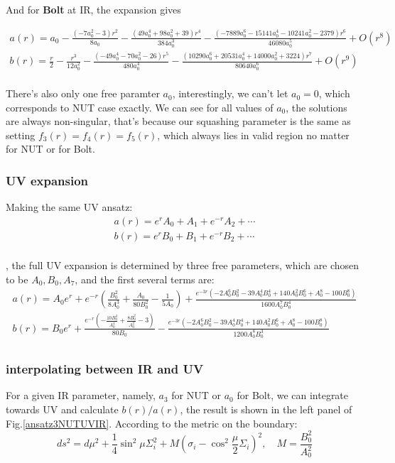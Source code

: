 \documentclass[12pt, a4paper]{article}
\numberwithin{equation}{section}
\newcommand{\be}{\begin{equation}}
\newcommand{\ee}{\end{equation}}
\begin{document}
	And for \textbf{Bolt} at IR, the expansion gives
	
\be
\begin{aligned}
	a(r) = a_0-\frac{\left(-7 a_0^2-3\right) r^2}{8 a_0}-\frac{\left(49 a_0^4+98 a_0^2+39\right) r^4}{384 a_0^3}-\frac{\left(-7889 a_0^6-15141
		a_0^4-10241 a_0^2-2379\right) r^6}{46080 a_0^5}+O\left(r^8\right)\\
	b(r) = \frac{r}{2}-\frac{r^3}{12 a_0^2}-\frac{\left(-49 a_0^4-70 a_0^2-26\right) r^5}{480 a_0^4}-\frac{\left(10290 a_0^6+20531 a_0^4+14000
		a_0^2+3224\right) r^7}{80640 a_0^6}+O\left(r^9\right)\\
\end{aligned}
\ee

	There's also only one free paramter $a_0$, interestingly, we can't let $a_0 = 0$, which corresponds to NUT case exactly. We can see for all values of $a_0$, the solutions are always non-singular, that's because our squashing parameter is the same as setting $f_3(r) = f_4(r) = f_5(r)$, which always lies in valid region no matter for NUT or for Bolt.
	
	\subsubsection{UV expansion}
	Making the same UV ansatz:
\be
\begin{aligned}
	a(r) = e^r A_0 + A_1 + e^{-r}A_2 + \cdots\\
	b(r) = e^r B_0 + B_1 + e^{-r}B_2 + \cdots\\
\end{aligned}
\ee
	
	, the full UV expansion is determined by three free parameters, which are chosen to be $A_0, B_0, A_7$, and the first several terms are:
\be
\begin{aligned}
		a(r) = A_0 e^r + e^{-r} \left(\frac{B_0^2}{8 A_0^3}+\frac{A_0}{80 B_0^2}-\frac{1}{5 A_0}\right)+\frac{e^{-3 r} \left(-2 A_0^6 B_0^2-39 A_0^4 B_0^4+140 A_0^2 B_0^6+A_0^8-100 B_0^8\right)}{1600A_0^7 B_0^4} \\
	b(r)=B_0 e^r + \frac{e^{-r} \left(-\frac{10 B_0^4}{A_0^4}+\frac{8 B_0^2}{A_0^2}-3\right)}{80 B_0}-\frac{e^{-3 r} \left(-2 A_0^6 B_0^2-39 A_0^4 B_0^4+140 A_0^2 B_0^6+A_0^8-100 B_0^8\right)}{1200A_0^8 B_0^3}\\
\end{aligned}
\ee

	\subsubsection{interpolating between IR and UV}
For a given IR parameter, namely, $a_3$ for NUT or $a_0$ for Bolt, we can integrate towards UV and calculate $b(r)/a(r)$, the result is shown in the left panel of Fig.\ref{ansatz3NUTUVIR}. According to the metric on the boundary:
\be
	ds^2 = d\mu^2 + \frac{1}{4}\sin^2\mu \Sigma_i^2 + M(\sigma_i-\cos^2\frac{\mu}{2}\Sigma_i)^2,\quad M = \frac{B_0^2}{A_0^2}
\ee
\end{document}
